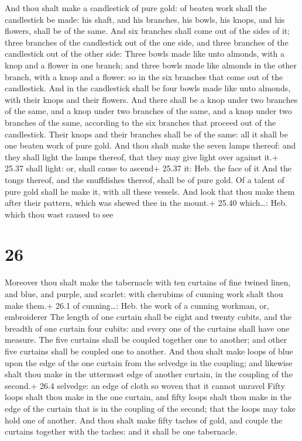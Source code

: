  And thou shalt make a candlestick of pure gold: of
beaten work shall the candlestick be made: his shaft, and his branches,
his bowls, his knops, and his flowers, shall be of the same.
 And six branches shall come out of the sides of it; three
branches of the candlestick out of the one side, and three branches of
the candlestick out of the other side:  Three bowls made
like unto almonds, with a knop and a flower in one branch; and three
bowls made like almonds in the other branch, with a knop and a flower:
so in the six branches that come out of the candlestick. 
And in the candlestick shall be four bowls made like unto almonds, with
their knops and their flowers.  And there shall be a knop
under two branches of the same, and a knop under two branches of the
same, and a knop under two branches of the same, according to the six
branches that proceed out of the candlestick.  Their knops
and their branches shall be of the same: all it shall be one beaten work
of pure gold.  And thou shalt make the seven lamps thereof:
and they shall light the lamps thereof, that they may give light over
against it.+ 25.37 shall light: or, shall cause to ascend+ 25.37 it:
Heb. the face of it  And the tongs thereof, and the
snuffdishes thereof, shall be of pure gold.  Of a talent of
pure gold shall he make it, with all these vessels.  And
look that thou make them after their pattern, which was shewed thee in
the mount.+ 25.40 which\ldots: Heb. which thou wast caused to see

\hypertarget{section-25}{%
\section{26}\label{section-25}}

 Moreover thou shalt make the tabernacle with ten curtains
of fine twined linen, and blue, and purple, and scarlet: with cherubims
of cunning work shalt thou make them.+ 26.1 of cunning\ldots: Heb. the
work of a cunning workman, or, embroiderer  The length of
one curtain shall be eight and twenty cubits, and the breadth of one
curtain four cubits: and every one of the curtains shall have one
measure.  The five curtains shall be coupled together one to
another; and other five curtains shall be coupled one to another.
 And thou shalt make loops of blue upon the edge of the one
curtain from the selvedge in the coupling; and likewise shalt thou make
in the uttermost edge of another curtain, in the coupling of the
second.+ 26.4 selvedge: an edge of cloth so woven that it cannot unravel
 Fifty loops shalt thou make in the one curtain, and fifty
loops shalt thou make in the edge of the curtain that is in the coupling
of the second; that the loops may take hold one of another. 
And thou shalt make fifty taches of gold, and couple the curtains
together with the taches: and it shall be one tabernacle.

